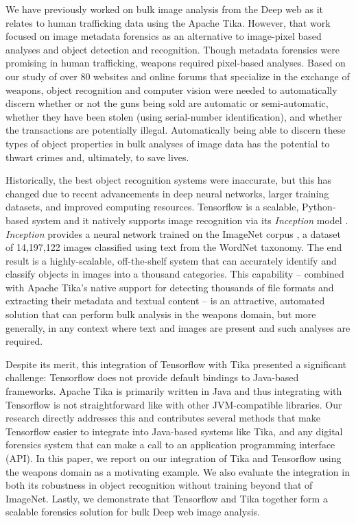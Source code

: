 
We have previously worked on bulk image analysis from the Deep web as it relates to human trafficking data \cite{mattmann7tg} using the Apache Tika. However, that work focused on image metadata forensics as an alternative to image-pixel based analyses and object detection and recognition. Though metadata forensics were promising in human trafficking, weapons required pixel-based analyses. Based on our study of over 80 websites and online forums that specialize in the exchange of weapons, object recognition and computer vision were needed to automatically discern whether or not the guns being sold are automatic or semi-automatic, whether they have been stolen (using serial-number identification), and whether the transactions are potentially illegal. Automatically being able to discern these types of object properties in bulk analyses of image data has the potential to thwart crimes and, ultimately, to save lives.

Historically, the best object recognition systems were inaccurate, but this has changed due to recent advancements in deep neural networks, larger training datasets, and improved computing resources. Tensorflow is a scalable, Python-based system and it natively supports image recognition via its \textit{Inception} model \cite{abadi2016tensorflow}. \textit{Inception} provides a neural network trained on the ImageNet corpus \cite{krizhevsky2012imagenet}, a dataset of 14,197,122 images classified using text from the WordNet taxonomy. The end result is a highly-scalable, off-the-shelf system that can accurately identify and classify objects in images into a thousand categories. This capability -- combined with Apache Tika's native support for detecting thousands of file formats and extracting their metadata and textual content -- is an attractive, automated solution that can perform bulk analysis in the weapons domain, but more generally, in any context where text and images are present and such analyses are required.

Despite its merit, this integration of Tensorflow with Tika presented a significant challenge: Tensorflow does not provide default bindings to Java-based frameworks. Apache Tika is primarily written in Java and thus integrating with Tensorflow is not straightforward like with other JVM-compatible libraries. Our research directly addresses this and contributes several methods that make Tensorflow easier to integrate into Java-based systems like Tika, and any digital forensics system that can make a call to an application programming interface (API). In this paper, we report on our integration of Tika and Tensorflow using the weapons domain as a motivating example. We also evaluate the integration in both its robustness in object recognition without training beyond that of ImageNet. Lastly, we demonstrate that Tensorflow and Tika together form  a scalable forensics solution for bulk Deep web image analysis.

